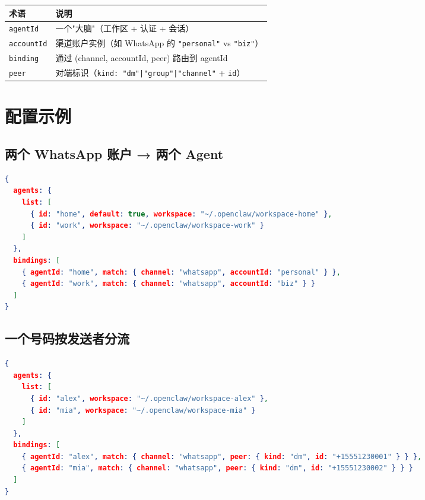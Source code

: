 \begin{center}
\begin{tabular}{ll}
\toprule
\textbf{术语} & \textbf{说明} \\
\midrule
\texttt{agentId} & 一个"大脑"（工作区 + 认证 + 会话） \\
\texttt{accountId} & 渠道账户实例（如 WhatsApp 的 \texttt{"personal"} vs \texttt{"biz"}） \\
\texttt{binding} & 通过 (channel, accountId, peer) 路由到 agentId \\
\texttt{peer} & 对端标识（\texttt{kind: "dm"|"group"|"channel"} + \texttt{id}） \\
\bottomrule
\end{tabular}
\end{center}

\section{配置示例}

\subsection{两个 WhatsApp 账户 → 两个 Agent}

\begin{lstlisting}[language=json]
{
  agents: {
    list: [
      { id: "home", default: true, workspace: "~/.openclaw/workspace-home" },
      { id: "work", workspace: "~/.openclaw/workspace-work" }
    ]
  },
  bindings: [
    { agentId: "home", match: { channel: "whatsapp", accountId: "personal" } },
    { agentId: "work", match: { channel: "whatsapp", accountId: "biz" } }
  ]
}
\end{lstlisting}

\subsection{一个号码按发送者分流}

\begin{lstlisting}[language=json]
{
  agents: {
    list: [
      { id: "alex", workspace: "~/.openclaw/workspace-alex" },
      { id: "mia", workspace: "~/.openclaw/workspace-mia" }
    ]
  },
  bindings: [
    { agentId: "alex", match: { channel: "whatsapp", peer: { kind: "dm", id: "+15551230001" } } },
    { agentId: "mia", match: { channel: "whatsapp", peer: { kind: "dm", id: "+15551230002" } } }
  ]
}
\end{lstlisting}

